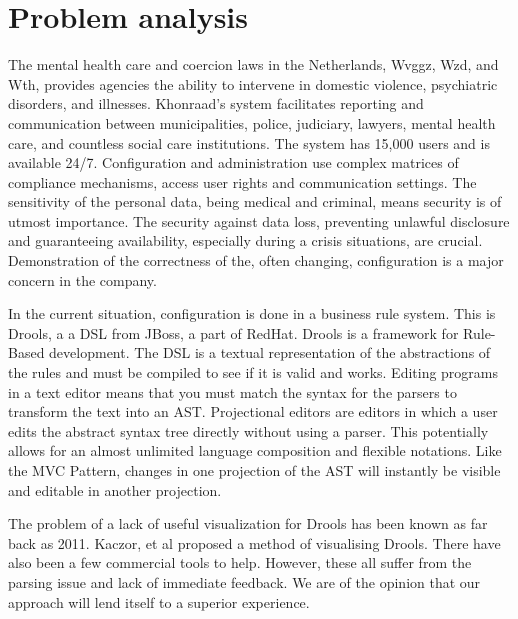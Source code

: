 \section{Problem analysis}

The mental health care and coercion laws in the Netherlands, Wvggz, Wzd, and Wth, provides agencies the ability to intervene in domestic violence, psychiatric disorders, and illnesses.
Khonraad's system facilitates reporting and communication between municipalities, police, judiciary, lawyers, mental health care, and countless social care institutions.
The system has 15,000 users and is available 24/7. Configuration and administration use complex matrices of compliance mechanisms, access user rights and communication settings.
The sensitivity of the personal data, being medical and criminal, means security is of utmost importance.
The security against data loss, preventing unlawful disclosure and guaranteeing availability, especially during a crisis situations, are crucial.
Demonstration of the correctness of the, often changing, configuration is a major concern in the company. 

In the current situation, configuration is done in a business rule system. This is Drools, a a DSL from JBoss, a part of RedHat.
Drools is a framework for Rule-Based development.
The DSL is a textual representation of the abstractions of the rules and must be compiled to see if it is valid and works.
Editing programs in a text editor means that you must match the syntax for the parsers to transform the text into an AST.
Projectional editors are editors in which a user edits the abstract syntax tree directly without using a parser\cite{voelter2014generic}.
This potentially allows for an almost unlimited language composition and flexible notations.
Like the MVC Pattern, changes in one projection of the AST will instantly be visible and editable in another projection\cite{guttormsen2017consistent}.

The problem of a lack of useful visualization for Drools has been known as far back as 2011.
Kaczor, et al\cite{kaczor2011visual} proposed a method of visualising Drools. 
There have also been a few commercial tools to help.
However, these all suffer from the parsing issue and lack of immediate feedback. 
We are of the opinion that our approach will lend itself to a superior experience.
